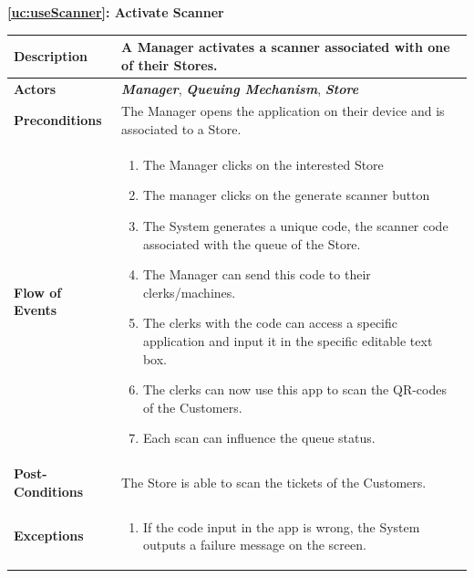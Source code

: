 \documentclass[a4paper, 10pt, oneside]{article}
\begin{document}
\begin{center}
{\textbf{\ref{uc:useScanner}: Activate Scanner}}
\end{center}
\begin{tabularx}{\linewidth}{| l | X |}
	
	\hline
	\textbf{Description} & A Manager activates a scanner associated with one of their Stores.\\
	

	\hline
	\textbf{Actors} & \textbf{\textit{Manager}}, \textit{\textbf{Queuing Mechanism}}, \textbf{\textit{Store}}\\
	
	\hline
	\textbf{Preconditions} & The Manager opens the application on their device and is associated to a Store.\\
	
	\hline
	\textbf{Flow of Events} & \parbox{0.7\textwidth}{	
		\begin{enumerate}
			\item The Manager clicks on the interested Store
			\item The manager clicks on the generate scanner button
			\item The System generates a unique code, the scanner code associated with the queue of the Store.
			\item The Manager can send this code to their clerks/machines.
			\item The clerks with the code can access a specific application and input it in the specific editable text box.
			\item The clerks can now use this app to scan the QR-codes of the Customers.
			\item Each scan can influence the queue status.
	\end{enumerate}}\\
	
	\hline
	\textbf{Post-Conditions} & The Store is able to scan the tickets of the Customers.\\
	
	\hline
	\textbf{Exceptions} & \parbox{0.7\textwidth}{ \begin{enumerate}
			\item If the code input in the app is wrong, the System outputs a failure message on the screen.
		\end{enumerate}}\\

	\hline
	
\end{tabularx}
\end{document}
